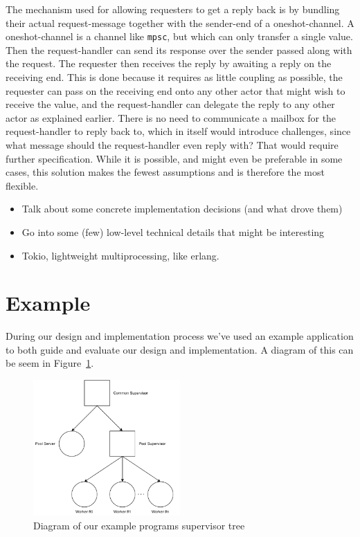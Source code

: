 \documentclass[a4paper]{article}
\newcommand\figref[1]{Figure~\ref{#1}}
\begin{document}
\begin{itemize}
  The mechanism used for allowing requesters to get a reply back is by bundling
  their actual request-message together with the sender-end of a
  oneshot-channel. A oneshot-channel is a channel like \texttt{mpsc}, but which
  can only transfer a single value. Then the request-handler can send its
  response over the sender passed along with the request. The requester then
  receives the reply by awaiting a reply on the receiving end. This is done because
  it requires as little coupling as possible, the requester can pass on the
  receiving end onto any other actor that might wish to receive the value, and
  the request-handler can delegate the reply to any other actor as explained
  earlier. There is no need to communicate a mailbox for the request-handler to
  reply back to, which in itself would introduce challenges, since what message
  should the request-handler even reply with? That would require further
  specification. While it is possible, and might even be preferable in some
  cases, this solution makes the fewest assumptions and is therefore the most
  flexible. %

\end{itemize}


\begin{itemize}
\item Talk about some concrete implementation decisions (and what drove them)
\item Go into some (few) low-level technical details that might be interesting
\item Tokio, lightweight multiprocessing, like erlang.
\end{itemize}

\newpage
\section{Example}
During our design and implementation process we've used an example application
to both guide and evaluate our design and implementation. A diagram of this can
be seem in \figref{fig:example_diagram}.

\begin{figure}[h!]
  \centering
  \includegraphics[width=0.5\textwidth]{./resources/PoolDiagram.pdf}
  \caption{Diagram of our example programs supervisor tree}
  \label{fig:example_diagram}
\end{figure}
\end{document}

